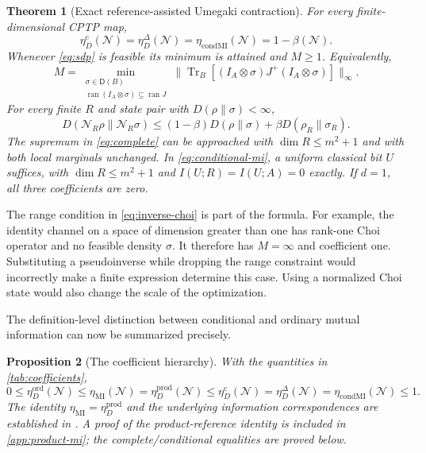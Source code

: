 \documentclass[11pt]{article}
\numberwithin{equation}{section}
\newtheorem{theorem}{Theorem}[section]
\newtheorem{proposition}[theorem]{Proposition}
\theoremstyle{definition}
\theoremstyle{remark}
\DeclareMathOperator{\Tr}{Tr}
\DeclareMathOperator{\ran}{ran}
\newcommand{\N}{\mathcal N}
\newcommand{\norm}[1]{\lVert #1\rVert}
\newcommand{\etaC}{\eta_D^{\mathrm c}}
\newcommand{\etaDel}{\eta_D^{\Delta}}
\newcommand{\etaCM}{\eta_{\mathrm{condMI}}}
\newcommand{\etaMI}{\eta_{\mathrm{MI}}}
\newcommand{\etaOrd}{\eta_D^{\mathrm{ord}}}
\newcommand{\etaP}{\eta_D^{\mathrm{prod}}}
\newcommand{\States}{\mathsf D}
\begin{document}
\begin{theorem}[Exact reference-assisted Umegaki contraction]
\label{thm:main}
For every finite-dimensional CPTP map,
\begin{equation}
 \boxed{\quad \etaC(\N)=\etaDel(\N)=\etaCM(\N)=1-\beta(\N).\quad}
 \label{eq:main}
\end{equation}
Whenever \eqref{eq:sdp} is feasible its minimum is attained and $M\geq1$.
Equivalently,
\begin{equation}
 M=\min_{\substack{\sigma\in\States(B)\\
       \ran(I_A\otimes\sigma)\subseteq\ran J}}
 \norm{\Tr_B[(I_A\otimes\sigma)J^+(I_A\otimes\sigma)]}_\infty .
 \label{eq:inverse-choi}
\end{equation}
For every finite $R$ and state pair with $D(\rho\|\sigma)<\infty$,
\begin{equation}
 D(\N_R\rho\|\N_R\sigma)
 \leq (1-\beta)D(\rho\|\sigma)+\beta D(\rho_R\|\sigma_R).
 \label{eq:universal}
\end{equation}
The supremum in \eqref{eq:complete} can be approached with $\dim R\leq m^2+1$
and with both local marginals unchanged. In \eqref{eq:conditional-mi}, a
uniform classical bit $U$ suffices, with $\dim R\leq m^2+1$ and
$I(U;R)=I(U;A)=0$ exactly. If $d=1$, all three coefficients are zero.
\end{theorem}

The range condition in \eqref{eq:inverse-choi} is part of the formula. For
example, the identity channel on a space of dimension greater than one has
rank-one Choi operator and no feasible density $\sigma$. It therefore has
$M=\infty$ and coefficient one. Substituting a pseudoinverse while dropping the
range constraint would incorrectly make a finite expression determine this case.
Using a normalized Choi state would also change the scale of the optimization.

The definition-level distinction between conditional and ordinary mutual
information can now be summarized precisely.
\begin{proposition}[The coefficient hierarchy]
\label{prop:hierarchy}
With the quantities in \cref{tab:coefficients},
\begin{equation}
 0\leq\etaOrd(\N)\leq\etaMI(\N)=\etaP(\N)
 \leq\etaC(\N)=\etaDel(\N)=\etaCM(\N)\leq1.
 \label{eq:hierarchy}
\end{equation}
The identity $\etaMI=\etaP$ and the underlying information correspondences
are established in \cite[Corollary~3]{HGNW26}. A proof of the product-reference
identity is included in \cref{app:product-mi}; the complete/conditional
equalities are proved below.
\end{proposition}
\end{document}
